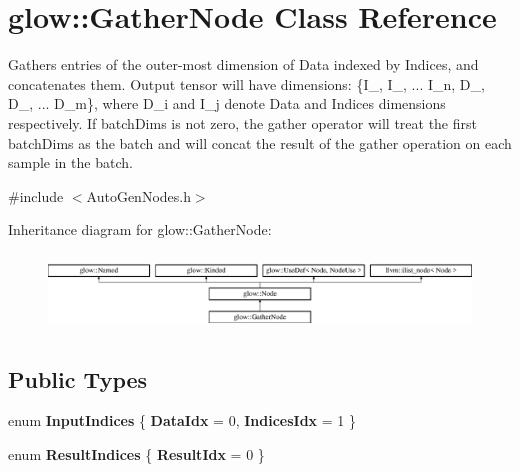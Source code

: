 \hypertarget{classglow_1_1_gather_node}{}\section{glow\+:\+:Gather\+Node Class Reference}
\label{classglow_1_1_gather_node}


Gathers entries of the outer-\/most dimension of Data indexed by Indices, and concatenates them. Output tensor will have dimensions\+: \{I\+\_, I\+\_, ... I\+\_\+n, D\+\_, D\+\_, ... D\+\_\+m\}, where D\+\_\+i and I\+\_\+j denote Data and Indices dimensions respectively. If batch\+Dims is not zero, the gather operator will treat the first batch\+Dims as the batch and will concat the result of the gather operation on each sample in the batch.  




{\ttfamily \#include $<$Auto\+Gen\+Nodes.\+h$>$}

Inheritance diagram for glow\+:\+:Gather\+Node\+:\begin{figure}[H]
\begin{center}
\leavevmode
\includegraphics[height=2.028986cm]{classglow_1_1_gather_node}
\end{center}
\end{figure}
\subsection*{Public Types}
\begin{DoxyCompactItemize}
\item 
\mbox{\label{classglow_1_1_gather_node_a047e58dd642bb9f6d04e962fac2d212c}} 
enum {\bfseries Input\+Indices} \{ {\bfseries Data\+Idx} = 0, 
{\bfseries Indices\+Idx} = 1
 \}
\item 
\mbox{\label{classglow_1_1_gather_node_a87abae88d95e3f831b87e7d6ae7de00c}} 
enum {\bfseries Result\+Indices} \{ {\bfseries Result\+Idx} = 0
 \}
\end{DoxyCompactItemize}
